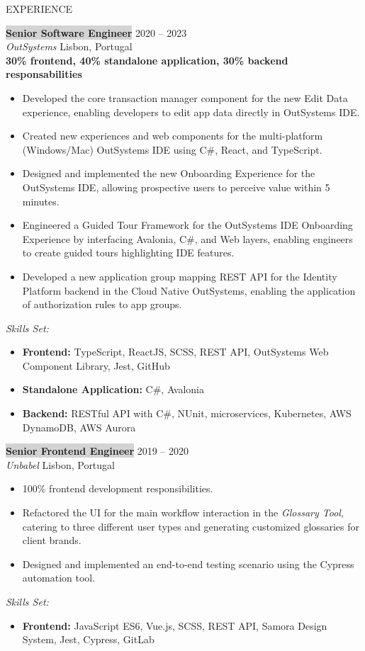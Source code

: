 \documentclass{resume} %
\begin{document}
\begin{rSection}{EXPERIENCE}

\colorbox{lightgray}{\textbf{Senior Software Engineer}} \hfill 2020 -- 2023\\
\textit{OutSystems} \hfill Lisbon, Portugal\\
\textbf{30\% frontend, 40\% standalone application, 30\% backend responsabilities}
\begin{itemize}
    \item Developed the core transaction manager component for the new Edit Data experience, enabling developers to edit app data directly in OutSystems IDE.
    \item Created new experiences and web components for the multi-platform (Windows/Mac) OutSystems IDE using C\#, React, and TypeScript.
    \item Designed and implemented the new Onboarding Experience for the OutSystems IDE, allowing prospective users to perceive value within 5 minutes.
    \item Engineered a Guided Tour Framework for the OutSystems IDE Onboarding Experience by interfacing Avalonia, C\#, and Web layers, enabling engineers to create guided tours highlighting IDE features.
    \item Developed a new application group mapping REST API for the Identity Platform backend in the Cloud Native OutSystems, enabling the application of authorization rules to app groups.
\end{itemize}

\textit{Skills Set:}
\begin{itemize}
    \item \textbf{Frontend:} TypeScript, ReactJS, SCSS, REST API, OutSystems Web Component Library, Jest, GitHub
    \item \textbf{Standalone Application:} C\#, Avalonia
    \item \textbf{Backend:} RESTful API with C\#, NUnit, microservices, Kubernetes, AWS DynamoDB, AWS Aurora
\end{itemize}
\hfill \break
\colorbox{lightgray}{\textbf{Senior Frontend Engineer}} \hfill 2019 -- 2020\\
\textit{Unbabel} \hfill Lisbon, Portugal
\begin{itemize}
    \item 100\% frontend development responsibilities.
    \item Refactored the UI for the main workflow interaction in the \textit{Glossary Tool}, catering to three different user types and generating customized glossaries for client brands.
    \item Designed and implemented an end-to-end testing scenario using the Cypress automation tool.
\end{itemize}

\textit{Skills Set:}
\begin{itemize}
    \item \textbf{Frontend:} JavaScript ES6, Vue.js, SCSS, REST API, Samora Design System, Jest, Cypress, GitLab
\end{itemize}
\end{rSection} 
\hfill \break
\end{document}
